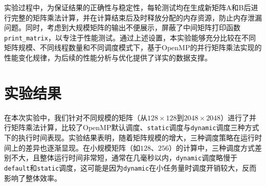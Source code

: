 \documentclass[a4paper, utf8]{ctexart}
\begin{document}
	实验过程中，为保证结果的正确性与稳定性，每轮测试均在生成新矩阵A和B后进行完整的矩阵乘法计算，并在计算结束后及时释放分配的内存资源，防止内存泄漏问题。同时，考虑到大规模矩阵的输出不便展示，屏蔽了中间矩阵打印函数\verb|print_matrix|，以专注于性能测试。通过上述设置，本实验能够充分比较在不同矩阵规模、不同线程数量和不同调度模式下，基于OpenMP的并行矩阵乘法实现的性能变化规律，为后续的性能分析与优化提供了详实的数据支撑。
	
	\section{实验结果}
	
	在本次实验中，我们针对不同规模的矩阵（从$128\times128$到$2048\times2048$）进行了并行矩阵乘法计算，比较了OpenMP默认调度、\verb|static|调度与\verb|dynamic|调度三种方式下的执行时间表现。实验结果表明，随着矩阵规模的增大，三种调度策略在运行时间上的差异也逐渐显现。在小规模矩阵（如$128$、$256$）的计算中，三种调度方式差别不大，且整体运行时间非常短，通常在几毫秒以内，\verb|dynamic|调度略慢于\verb|default|和\verb|static|调度，这可能是因为\verb|dynamic|在小任务量时调度开销较大，反而影响了整体效率。
	
\end{document}
